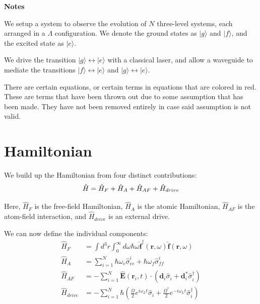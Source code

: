 \documentclass[a4paper, 11pt]{article}
\numberwithin{equation}{section}
\newcommand{\ket}[1]{| #1 \rangle}
\begin{document}
{\LARGE \textbf{Notes} \par}\vspace{1em}

We setup a system to observe the evolution of $N$ three-level systems,
each arranged in a $\Lambda$ configuration. We denote the ground states as $\ket{g}$
and $\ket{f}$, and the excited state as $\ket{e}$.

We drive the transition $\ket{g}\leftrightarrow\ket{e}$ with a classical laser, and
allow a waveguide to mediate the transitions $\ket{f}\leftrightarrow\ket{e}$ and $\ket{g}\leftrightarrow\ket{e}$.

 There are certain equations, or certain terms in
equations that are colored in red. These are terms that have been thrown out due to
some assumption that has been made. They have not been removed entirely in case said
assumption is not valid.

\section{Hamiltonian}

We build up the Hamiltonian from four distinct contributions:
\begin{equation}
  \hat{H} = \hat{H}_F + \hat{H}_A + \hat{H}_{AF} + \hat{H}_{drive}\\
\end{equation}

Here, $\hat{H}_F$ is the free-field Hamiltonian, $\hat{H}_A$ is the atomic
Hamiltonian, $\hat{H}_{AF}$ is the atom-field interaction, and $\hat{H}_{drive}$ is an
external drive.

We can now define the individual components:
\begin{align*}
  \hat{H}_F &= \int d^3r \int_0^\infty d\omega \hbar\omega \hat{\mathbf{f}}^\dagger
  (\mathbf{r}, \omega) \hat{\mathbf{f}}(\mathbf{r}, \omega)\\
  \hat{H}_A &= \sum_{i=1}^N \hbar\omega_e \hat{\sigma}_{ee}^i + \hbar\omega_f
  \hat{\sigma}_{ff}^i\\
  \hat{H}_{AF} &= -\sum_{i=1}^N \hat{\mathbf{E}}(\mathbf{r}_i, t) \cdot \left(
  \mathbf{d}_i \hat{\sigma}_i + \mathbf{d}_i^* \hat{\sigma}_i^\dagger \right)\\
  \hat{H}_{drive} &= -\sum_{i=1}^N \hbar \left( \frac{\Omega}{2} e^{i\omega_Lt}
  \hat{\sigma}_i + \frac{\Omega^*}{2} e^{-i\omega_Lt} \hat{\sigma}_i^\dagger \right)
\end{align*}
\end{document}
